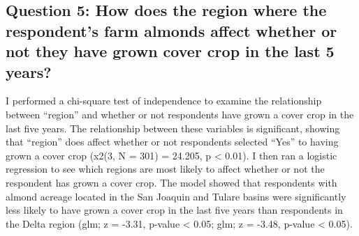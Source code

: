 \documentclass[12pt,]{article}
\newenvironment{Shaded}{\begin{snugshade}}{\end{snugshade}}
\newcommand{\KeywordTok}[1]{\textcolor[rgb]{0.13,0.29,0.53}{\textbf{#1}}}
\newcommand{\StringTok}[1]{\textcolor[rgb]{0.31,0.60,0.02}{#1}}
\newcommand{\CommentTok}[1]{\textcolor[rgb]{0.56,0.35,0.01}{\textit{#1}}}
\newcommand{\OperatorTok}[1]{\textcolor[rgb]{0.81,0.36,0.00}{\textbf{#1}}}
\newcommand{\NormalTok}[1]{#1}
\begin{document}
\begin{table}

\caption{\label{tab:Question 4}Cover Crop Adoption by Size of Almond Operation}
\centering
{}
\end{table}

\FloatBarrier

\subsection{Question 5: How does the region where the respondent's farm
almonds affect whether or not they have grown cover crop in the last 5
years?}\label{question-5-how-does-the-region-where-the-respondents-farm-almonds-affect-whether-or-not-they-have-grown-cover-crop-in-the-last-5-years}

I performed a chi-square test of independence to examine the
relationship between ``region'' and whether or not respondents have
grown a cover crop in the last five years. The relationship between
these variables is significant, showing that ``region'' does affect
whether or not respondents selected ``Yes'' to having grown a cover crop
(x2(3, N = 301) = 24.205, p \textless{} 0.01). I then ran a logistic
regression to see which regions are most likely to affect whether or not
the respondent has grown a cover crop. The model showed that respondents
with almond acreage located in the San Joaquin and Tulare basins were
significantly less likely to have grown a cover crop in the last five
years than respondents in the Delta region (glm; z = -3.31, p-value
\textless{} 0.05; glm; z = -3.48, p-value \textless{} 0.05).

\begin{Shaded}
\end{Shaded}
\end{document}
